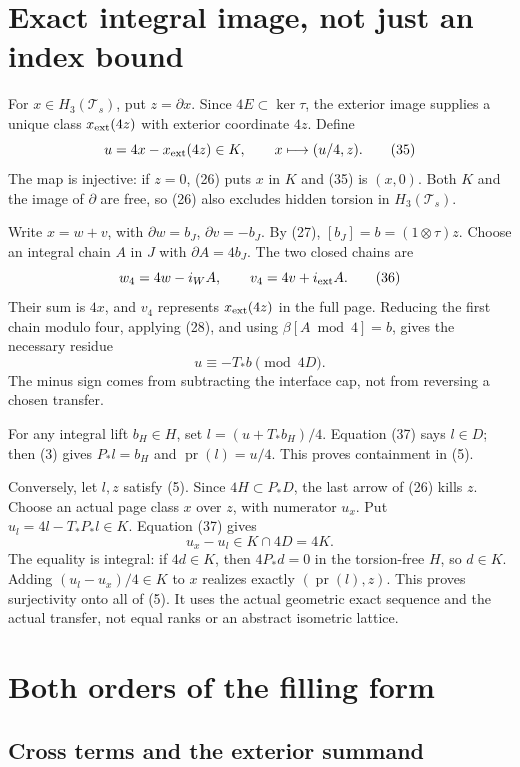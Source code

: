 \documentclass[11pt]{article}
\newcommand{\pr}{\operatorname{pr}}
\begin{document}
\section{Exact integral image, not just an index bound}

For \(x\in H_3(\mathcal T_s)\), put \(z=\partial x\).
Since \(4E\subset\ker\tau\), the exterior image supplies a
unique class \(x_{\rm ext}(4z)\) with exterior coordinate \(4z\).
Define
\[
             u=4x-x_{\rm ext}(4z)\in K,\qquad
             x\longmapsto(u/4,z).                  \tag{35}
\]
The map is injective: if \(z=0\), (26) puts \(x\) in \(K\)
and (35) is \((x,0)\).
Both \(K\) and the image of \(\partial\) are free, so (26)
also excludes hidden torsion in \(H_3(\mathcal T_s)\).

Write \(x=w+v\), with \(\partial w=b_J\),
\(\partial v=-b_J\). By (27), \([b_J]=b=(1\otimes\tau)z\).
Choose an integral chain \(A\) in \(J\) with
\(\partial A=4b_J\). The two closed chains are
\[
                  w_4=4w-i_WA,\qquad
                  v_4=4v+i_{\rm ext}A.             \tag{36}
\]
Their sum is \(4x\), and \(v_4\) represents
\(x_{\rm ext}(4z)\) in the full page. Reducing the first
chain modulo four, applying (28), and using
\(\beta[A\bmod4]=b\), gives the necessary residue
\[
                        u\equiv-T_*b\pmod{4D}.     \tag{37}
\]
The minus sign comes from subtracting the interface cap,
not from reversing a chosen transfer.

For any integral lift \(b_H\in H\), set
\(l=(u+T_*b_H)/4\). Equation (37) says \(l\in D\);
then (3) gives \(P_*l=b_H\) and \(\pr(l)=u/4\).
This proves containment in (5).

Conversely, let \(l,z\) satisfy (5). Since \(4H\subset P_*D\),
the last arrow of (26) kills \(z\). Choose an actual page class
\(x\) over \(z\), with numerator \(u_x\). Put
\(u_l=4l-T_*P_*l\in K\).
Equation (37) gives
\[
                  u_x-u_l\in K\cap4D=4K.           \tag{38}
\]
The equality is integral: if \(4d\in K\), then \(4P_*d=0\)
in the torsion-free \(H\), so \(d\in K\).
Adding \((u_l-u_x)/4\in K\) to \(x\) realizes exactly
\((\pr(l),z)\). This proves surjectivity onto all of (5).
It uses the actual geometric exact sequence and the actual
transfer, not equal ranks or an abstract isometric lattice.

\section{Both orders of the filling form}

\subsection{Cross terms and the exterior summand}
\end{document}
